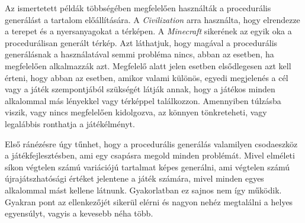 Az ismertetett példák többségében megfelelően használták a procedurális generálást a tartalom előállítására. A \textit{Civilization} arra használta, hogy elrendezze a terepet és a nyersanyagokat a térképen. A \textit{Minecraft} sikerének az egyik oka a procedurálisan generált térkép. Azt láthatjuk, hogy magával a procedurális generálásnak a használatával semmi probléma nincs, abban az esetben, ha megfelelően alkalmazzák azt. Megfelelő alatt jelen esetben elsődlegesen azt kell érteni, hogy abban az esetben, amikor valami különös, egyedi megjelenés a cél vagy a játék szempontjából szükségét látják annak, hogy a játékos minden alkalommal más lényekkel vagy térképpel találkozzon. Amennyiben túlzásba viszik, vagy nincs megfelelően kidolgozva, az könnyen tönkreteheti, vagy legalábbis ronthatja a játékélményt.

Első ránézésre úgy tűnhet, hogy a procedurális generálás valamilyen csodaeszköz a játékfejlesztésben, ami egy csapásra megold minden problémát. Mivel elméleti síkon végtelen számú variációjú tartalmat képes generálni, ami végtelen számú újrajátszhatósági értéket jelentene a játék számára, mivel minden egyes alkalommal mást kellene látnunk. Gyakorlatban ez sajnos nem így működik. Gyakran pont az ellenkezőjét sikerül elérni és nagyon nehéz megtalálni a helyes egyensúlyt, vagyis a kevesebb néha több.

